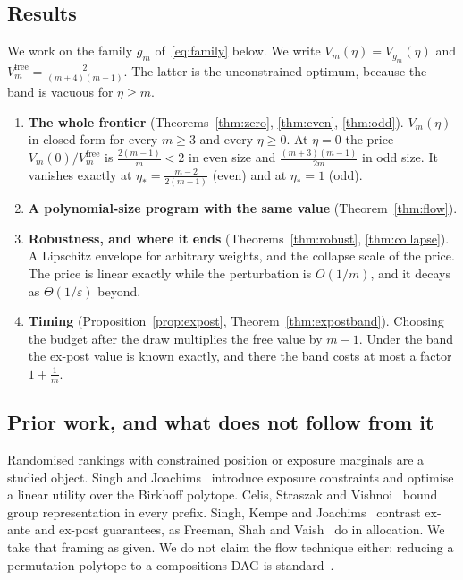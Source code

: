 \subsection{Results}

We work on the family $g_{m}$ of~\eqref{eq:family} below. We write
$V_{m}(\eta)=V_{g_{m}}(\eta)$ and $V^{\mathrm{free}}_{m}=\frac{2}{(m+4)(m-1)}$. The latter is
the unconstrained optimum, because the band is vacuous for $\eta\ge m$.

\begin{enumerate}
\item[1)] \textbf{The whole frontier} (Theorems~\ref{thm:zero}, \ref{thm:even},
\ref{thm:odd}). $V_{m}(\eta)$ in closed form for every $m\ge3$ and every $\eta\ge0$. At
$\eta=0$ the price $V_{m}(0)/V^{\mathrm{free}}_{m}$ is $\frac{2(m-1)}{m}<2$ in even size and
$\frac{(m+3)(m-1)}{2m}$ in odd size. It vanishes exactly at $\eta_{*}=\frac{m-2}{2(m-1)}$
(even) and at $\eta_{*}=1$ (odd).
\item[2)] \textbf{A polynomial-size program with the same value} (Theorem~\ref{thm:flow}).
\item[3)] \textbf{Robustness, and where it ends} (Theorems~\ref{thm:robust},
\ref{thm:collapse}). A Lipschitz envelope for arbitrary weights, and the collapse scale of
the price. The price is linear exactly while the perturbation is $O(1/m)$, and it decays as
$\Theta(1/\varepsilon)$ beyond.
\item[4)] \textbf{Timing} (Proposition~\ref{prop:expost}, Theorem~\ref{thm:expostband}).
Choosing the budget after the draw multiplies the free value by $m-1$. Under the band the
ex-post value is known exactly, and there the band costs at most a factor $1+\frac1m$.
\end{enumerate}

\subsection{Prior work, and what does not follow from it}

Randomised rankings with constrained position or exposure marginals are a studied object.
Singh and Joachims~\cite{singh2018} introduce exposure constraints and optimise a linear
utility over the Birkhoff polytope. Celis, Straszak and Vishnoi~\cite{celis2018} bound group
representation in every prefix. Singh, Kempe and Joachims~\cite{singh2021} contrast ex-ante
and ex-post guarantees, as Freeman, Shah and Vaish~\cite{freeman2020} do in allocation. We
take that framing as given. We do not claim the flow technique either: reducing a permutation
polytope to a compositions DAG is standard~\cite{schrijver2003}.

